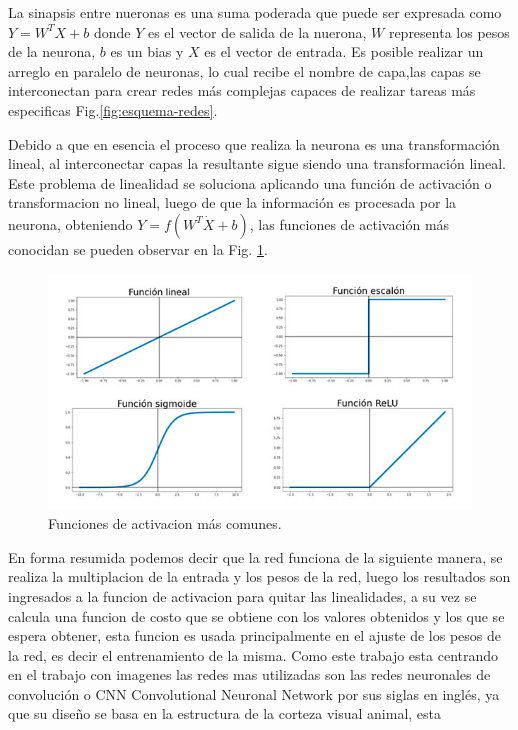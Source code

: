 La sinapsis entre nueronas es una suma poderada que puede ser expresada como $Y =W^T X + b$ donde $Y$ es el vector de salida de la nuerona,
$W$ representa los pesos de la neurona, $b$ es un bias y $X$ es el vector de entrada.
Es posible realizar un arreglo en paralelo de neuronas, lo cual recibe el nombre de capa,las capas se interconectan para crear redes
más complejas capaces de realizar tareas más especificas Fig.\ref{fig:esquema-redes}.

Debido a que en esencia el proceso que realiza la neurona es una transformación lineal, al interconectar capas la resultante sigue siendo
una transformación lineal. Este problema de linealidad se soluciona aplicando una función de activación o transformacion no lineal,
luego de que la información es procesada por la neurona, obteniendo $Y= f(W^T \dot X + b)$, las funciones de activación más conocidan se pueden observar en la
Fig. \ref{fig:funciones-activacion}.
\begin{figure}
    \centering
    \includegraphics[width=1\textwidth]{imgs/Funciones-de-activacion.jpg}
    \caption{Funciones de activacion más comunes.}
    \label{fig:funciones-activacion}
\end{figure}
En forma resumida podemos decir que la red funciona de la siguiente manera, se realiza la multiplacion de la entrada y los pesos de la red,
luego los resultados son ingresados a la funcion de activacion para quitar las linealidades, a su vez se calcula una funcion de costo que se obtiene
con los valores obtenidos y los que se espera obtener, esta funcion es usada principalmente en el ajuste de los pesos de la red, es decir el
entrenamiento de la misma.
Como este trabajo esta centrando en el trabajo con imagenes las redes mas utilizadas son las redes neuronales de convolución o
CNN Convolutional Neuronal Network por sus siglas en inglés, ya que su diseño se basa en la estructura de la corteza visual animal, esta
